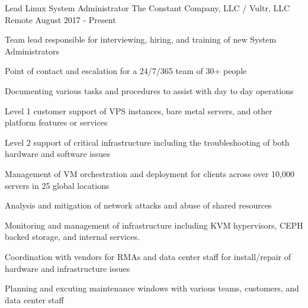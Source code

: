 
\begin{cventries}

	\cventry
	{Lead Linux System Administrator}
	{The Constant Company, LLC / Vultr, LLC}
	{Remote}
	{August 2017 - Present}
	{
		\begin{cvitems}
		\item {Team lead responsible for interviewing, hiring, and training of new System Administrators}
  		\item {Point of contact and escalation for a 24/7/365 team of 30+ people} 
		\item {Documenting various tasks and procedures to assist with day to day operations}
		\item {Level 1 customer support of VPS instances, bare metal servers, and other platform features or services}
		\item {Level 2 support of critical infrastructure including the troubleshooting of both hardware and software issues}
		\item {Management of VM orchestration and deployment for clients across over 10,000 servers in 25 global locations}
		\item {Analysis and mitigation of network attacks and abuse of shared resources}
		\item {Monitoring and management of infrastructure including KVM hypervisors,  CEPH backed storage, and internal services.}
		\item {Coordination with vendors for RMAs and data center staff for install/repair of hardware and infrastructure issues}
		\item {Planning and excuting maintenance windows with various teams, customers, and data center staff}
		\end{cvitems}
	}



\end{cventries}
